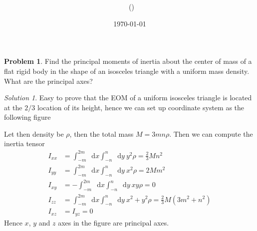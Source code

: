 \documentclass[twoside,11pt]{article}
\title{{\lms \Code \ \Ass}}
\author{\lms \name \ (\href{mailto:\mail}{\mail})}
\date{\sffamily \today}
\makeatletter
\newcommand{\lms}{\fontfamily{lmss}\selectfont} %
\renewcommand*\d{\mathop{}\!\mathrm{d}}
\theoremstyle{definition}
\newtheorem{problem}{\lms Problem}
\theoremstyle{remark}
\newtheorem*{solution}{Solution}
\renewcommand{\maketitle}{\bgroup\setlength{\parindent}{0pt}
\begin{flushleft}
  \textbf{\Large\@title}

  \@author
\end{flushleft}\egroup
}
\makeatother
\begin{document}
\maketitle
\thispagestyle{title}

\begin{problem}
Find the principal moments of inertia about the center of mass of a flat rigid
body in the shape of an isosceles triangle with a uniform mass density.
What are the principal axes?
\end{problem}
\begin{solution}
Easy to prove that the EOM of a uniform isosceles triangle is located at the
$2/3$ location of its height,
hence we can set up coordinate system as the following figure
\begin{figure}[H]
    \tikzexternalenable
    \centering
    \def\a{1.2}
    \def\b{1}
    \def\c{0.8}
    \tikzexternaldisable
\end{figure}
Let then density be $\rho$, then the total mass $M = 3mn\rho$.
Then we can compute the inertia tensor
\begin{align*}
    I_{xx} &= \int_{-m}^{2m}\d x \int_{-n}^n \d y~ y^2\rho
    = \frac{2}{3}Mn^2\\
    I_{yy} &= \int_{-m}^{2m}\d x \int_{-n}^n \d y~ x^2\rho
    = 2Mm^2\\
    I_{xy} &= -\int_{-m}^{2m}\d x \int_{-n}^n \d y~ xy\rho
    = 0\\
    I_{zz} &= \int_{-m}^{2m}\d x \int_{-n}^n \d y~ x^2+y^2\rho
    = \frac{2}{3}M(3m^2 + n^2)\\
    I_{xz} &= I_{yz} = 0
\end{align*}
Hence $x$, $y$ and $z$ axes in the figure are principal axes.
\end{solution}
\end{document}
